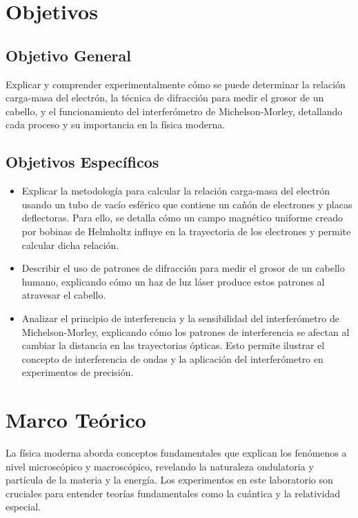\section{Objetivos}

\subsection{Objetivo General}
Explicar y comprender experimentalmente cómo se puede determinar la relación carga-masa del electrón, la técnica de difracción para medir el grosor de un cabello, y el funcionamiento del interferómetro de Michelson-Morley, detallando cada proceso y su importancia en la física moderna.

\subsection{Objetivos Específicos}
\begin{itemize}
    \item Explicar la metodología para calcular la relación carga-masa del electrón usando un tubo de vacío esférico que contiene un cañón de electrones y placas deflectoras. Para ello, se detalla cómo un campo magnético uniforme creado por bobinas de Helmholtz influye en la trayectoria de los electrones y permite calcular dicha relación.
    \item Describir el uso de patrones de difracción para medir el grosor de un cabello humano, explicando cómo un haz de luz láser produce estos patrones al atravesar el cabello.
    \item Analizar el principio de interferencia y la sensibilidad del interferómetro de Michelson-Morley, explicando cómo los patrones de interferencia se afectan al cambiar la distancia en las trayectorias ópticas. Esto permite ilustrar el concepto de interferencia de ondas y la aplicación del interferómetro en experimentos de precisión.
\end{itemize}

\section{Marco Teórico}
La física moderna aborda conceptos fundamentales que explican los fenómenos a nivel microscópico y macroscópico, revelando la naturaleza ondulatoria y partícula de la materia y la energía. Los experimentos en este laboratorio son cruciales para entender teorías fundamentales como la cuántica y la relatividad especial.

